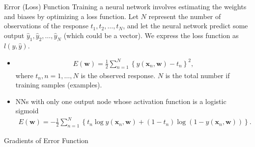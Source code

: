 \documentclass[10pt, hyperref={colorlinks = true,linkcolor = blue}]{beamer}
\begin{document}
{{{\begin{frame}{Error (Loss) Function}
  Training a neural network involves estimating the weights and biases by optimizing a loss function. Let \( N \) represent the number of observations of the response \( t_1, t_2, \ldots, t_N \), and let the neural network predict some output \( \hat{y}_1, \hat{y}_2, \ldots, \hat{y}_N \) (which could be a vector). We express the loss function as \( l(y, \hat{y}) \).
\begin{itemize}
\item {\color{purple}{Regression:}} {\color{red}{Sum of squared}} 
\begin{align*}
E(\bm w) = \frac{1}{2} \sum_{n=1}^{N} \left\{y(\bm x_n, \bm w)- t_n\right\}^2,
\end{align*}
where $t_n, n=1,\ldots,N$ is the observed response. $N$ is the total number if training samples (examples).
\item {\color{purple}{Binary classification:}} NNs with only one output node whose activation function is a logistic sigmoid {\color{red}{Cross-entropy error function}} 
\begin{align*}
E(\bm w) = -\frac{1}{2} \sum_{n=1}^{N} \left\{ t_n\log y(\bm x_n, \bm w) + (1-t_n) \log(1 - y(\bm x_n, \bm w)) \right\}. 
\end{align*}
\end{itemize}
\end{frame}


\begin{frame}{Gradients of Error Function}


\end{frame}}}}
\end{document}
